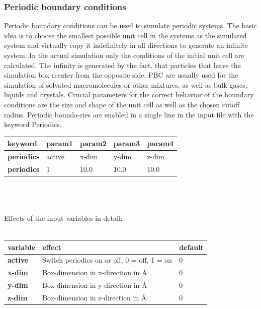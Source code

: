 \documentclass[10pt,a4paper]{article} %
\newif\ifdevelopment %
\begin{document}
	\subsubsection{Periodic boundary conditions}
	Periodic boundary conditions can be used to simulate periodic systems. The basic idea is to choose the smallest possible unit cell in the systems as the simulated system and virtually copy it indefinitely in all directions to generate an infinite system. In the actual simulation only the conditions of the initial unit cell are calculated. The infinity is generated by the fact, that particles that leave the simulation box reenter from the opposite side. PBC are usually used for the simulation of solvated macromolecules or other mixtures, as well as bulk gases, liquids and crystals. Crucial parameters for the correct behavior of the boundary conditions are the size and shape of the unit cell as well as the chosen cutoff radius. Periodic bounda-ries are enabled in a single line in the input file with the keyword Periodics.\\
	\begin{tabularx}{\textwidth}{l|X|X|X|X}
		\textbf{keyword} & param1 & param2 & param3 & param4 \\
		\hline
		\textbf{periodics} & active & x-dim & y-dim & z-dim \\
		\textbf{periodics} & 1 & 10.0 & 10.0 & 10.0 \\
	\end{tabularx}\\~\\~\\
	Effects of the input variables in detail:\\~\\
	\begin{tabularx}{\textwidth}{l|X|X}
		\textbf{variable} & effect & default \\
		\hline
		\textbf{active} & Switch periodics on or off, 0 = off, 1 = on & 0 \\
		\textbf{x-dim} & Box-dimension in x-direction in Å & 0 \\
		\textbf{y-dim} & Box-dimension in y-direction in Å & 0 \\
		\textbf{z-dim} & Box-dimension in z-direction in Å & 0 \\
	\end{tabularx}~\\


	\ifdevelopment
	\newpage
\end{document}
